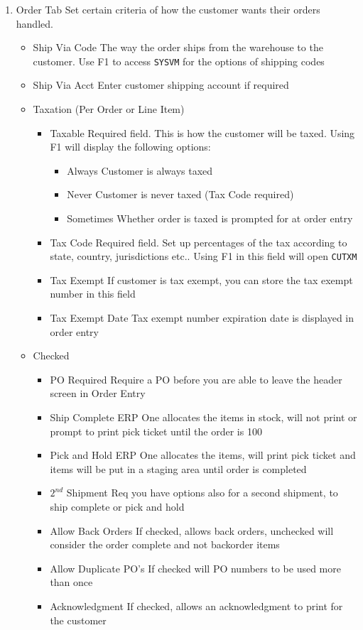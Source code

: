 \begin{enumerate}
	\item Order Tab \textemdash Set certain criteria of how the customer wants their orders handled.
	\begin{itemize}
		\item Ship Via Code \textemdash The way the order ships from the warehouse to the customer. Use F1 to access \texttt{SYSVM} for the options of shipping codes
		\item Ship Via Acct \textemdash Enter customer shipping account if required
		\item Taxation (Per Order or Line Item)
		\begin{itemize}
			\item Taxable \textemdash Required field. This is how the customer will be taxed. Using F1 will display the following options:
			\begin{itemize}
				\item Always \textemdash Customer is always taxed
				\item Never \textemdash Customer is never taxed (Tax Code required)
				\item Sometimes \textemdash Whether order is taxed is prompted for at order entry
			\end{itemize}
			\item Tax Code \textemdash Required field. Set up percentages of the tax according to state, country, jurisdictions etc.. Using F1 in this field will open \texttt{CUTXM}
			\item Tax Exempt \textemdash If customer is tax exempt, you can store the tax exempt number in this field
			\item Tax Exempt Date \textemdash Tax exempt number expiration date is displayed in order entry
		\end{itemize}
		\item Checked
		\begin{itemize}
			\item PO Required \textemdash Require a PO before you are able to leave the header screen in Order Entry
			\item Ship Complete \textemdash ERP One allocates the items in stock, will not print or prompt to print pick ticket until the order is 100%
			\item Pick and Hold \textemdash ERP One allocates the items, will print pick ticket and items will be put in a staging area until order is completed
			\item $2^{nd}$ Shipment Req \textemdash you have options also for a second shipment, to ship complete or pick and hold
			\item Allow Back Orders \textemdash If checked, allows back orders, unchecked will consider the order complete and not backorder items
			\item Allow Duplicate PO's \textemdash If checked will PO numbers to be used more than once
			\item Acknowledgment \textemdash If checked, allows an acknowledgment to print for the customer
		\end{itemize}
	\end{itemize}
	

\end{enumerate}
